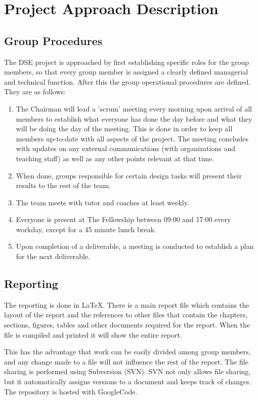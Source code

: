 \section{Project Approach Description}
\label{projectApproachDescription}
\subsection{Group Procedures}
The DSE project is approached by first establishing specific roles for the group members, so that every group member is assigned a clearly defined managerial and technical function. After this the group operational procedures are defined. They are as follows:

\begin{enumerate}
	\item The Chairman will lead a 'scrum' meeting every morning upon arrival of all members to establish what everyone has done the day before and what they will be doing the day of the meeting. This is done in order to keep all members up-to-date with all aspects of the project. The meeting concludes with updates on any external communications (with organizations and teaching staff) as well as any other points relevant at that time.
	\item When done, groups responsible for certain design tasks will present their results to the rest of the team.
	\item The team meets with tutor and coaches at least weekly.
	\item Everyone is present at The Fellowship between 09:00 and 17:00 every workday, except for a 45 minute lunch break.
	\item Upon completion of a deliverable, a meeting is conducted to establish a plan for the next deliverable.  
\end{enumerate}

\subsection{Reporting}
The reporting is done in \LaTeX. There is a main report file which contains the layout of the report and the references to other files that contain the chapters, sections, figures, tables and other documents required for the report. When the file is compiled and printed it will show the entire report.

This has the advantage that work can be easily divided among group members, and any change made to a file will not influence the rest of the report. The file sharing is performed using Subversion (SVN). SVN not only allows file sharing, but it automatically assigns versions to a document and keeps track of changes. The repository is hosted with Google\texttrademark Code.

